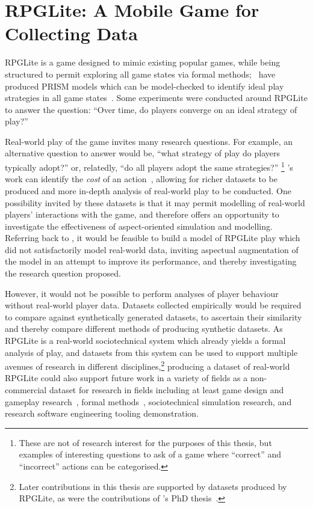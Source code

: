 \chapter{RPGLite: A Mobile Game for Collecting Data}\label{chap:rpglite}

RPGLite is a game designed to mimic existing popular games, while being
structured to permit exploring all game states via formal methods;
\citeauthor{kavanagh2020}~have produced PRISM models which can be model-checked
to identify ideal play strategies in all game states~\cite{kavanagh2020}. Some
experiments were conducted around RPGLite to answer the question: ``Over time,
do players converge on an ideal strategy of play?''

Real-world play of the game invites many research questions. For example, an
alternative question to answer would be, ``what strategy of play do players
typically adopt?'' or, relatedly, ``do all players adopt the same strategies?''
\footnote{These are not of research interest for the purposes of this thesis,
but examples of interesting questions to ask of a game where ``correct'' and
``incorrect'' actions can be categorised.} \citeauthor{kavanagh2020}'s work can
identify the \emph{cost} of an action~\cite{kavanagh2020,kavanagh2021thesis},
allowing for richer datasets to be produced and more in-depth analysis of
real-world play to be conducted. One possibility invited by these datasets is
that it may permit modelling of real-world players' interactions with the game,
and therefore offers an opportunity to investigate the effectiveness of
aspect-oriented simulation and modelling. Referring back to , it would be feasible to build a model of RPGLite play
which did not satisfactorily model real-world data, inviting aspectual
augmentation of the model in an attempt to improve its performance, and thereby
investigating the research question proposed.

However, it would not be possible to perform analyses of player behaviour
without real-world player data. Datasets collected empirically would be required
to compare against synthetically generated datasets, to ascertain their
similarity and thereby compare different methods of producing synthetic
datasets. As RPGLite is a real-world sociotechnical system which already yields
a formal analysis of play, and datasets from this system can be used to support
multiple avenues of research in different disciplines,\footnote{Later
contributions in this thesis are supported by datasets produced by RPGLite, as
were the contributions of \citeauthor{kavanagh2021thesis}'s PhD
thesis~\cite{kavanagh2021thesis}.} producing a dataset of real-world RPGLite
could also support future work in a variety of fields as a non-commercial
dataset for research in fields including at least game design and gameplay
research~\cite{kavanagh2021thesis}, formal methods~\cite{kavanagh2020},
sociotechnical simulation research, and research software engineering tooling
demonstration.

